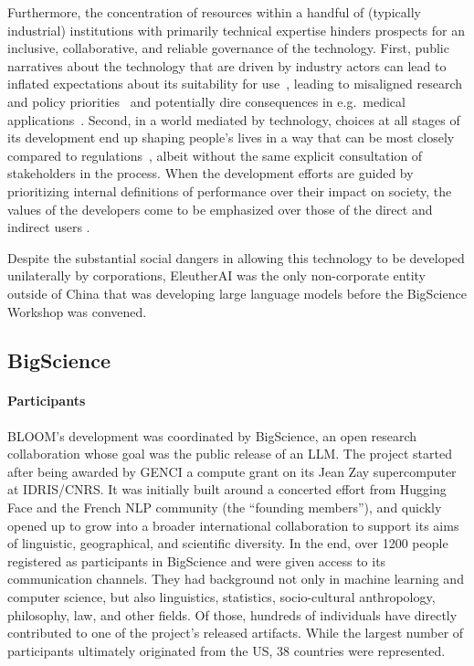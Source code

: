 Furthermore, the concentration of resources within a handful of (typically industrial) institutions with primarily technical expertise hinders prospects for an inclusive, collaborative, and reliable governance of the technology. First, public narratives about the technology that are driven by industry actors can lead to inflated expectations about its suitability for use~\citep{brennen2018hype,brennen2022expect}, leading to misaligned research and policy priorities~\citep{raji2022fallacy} and potentially dire consequences in e.g.\ medical applications~\citep{wong2021sepsis}. Second, in a world mediated by technology, choices at all stages of its development end up shaping people's lives in a way that can be most closely compared to regulations~\citep{winner1977technology,winner2017artifacts}, albeit without the same explicit consultation of stakeholders in the process. When the development efforts are guided by prioritizing internal definitions of performance over their impact on society, the values of the developers come to be emphasized over those of the direct and indirect users \citep{birhane2022values}.

Despite the substantial social dangers in allowing this technology to be developed unilaterally by corporations, EleutherAI \citep{phang2022eleutherai} was the only non-corporate entity outside of China that was developing large language models before the BigScience Workshop was convened.

\subsection{BigScience}\label{sec:organization}

\paragraph{Participants}
BLOOM's development was coordinated by BigScience, an open research collaboration whose goal was the public release of an LLM. The project started after being awarded by GENCI a compute grant on its Jean Zay supercomputer at IDRIS/CNRS. It was initially built around a concerted effort from Hugging Face and the French NLP community (the ``founding members''), and quickly opened up to grow into a broader international collaboration to support its aims of linguistic, geographical, and scientific diversity. In the end, over 1200 people registered as participants in BigScience and were given access to its communication channels. They had background not only in machine learning and computer science, but also linguistics, statistics, socio-cultural anthropology, philosophy, law, and other fields. Of those, hundreds of individuals have directly contributed to one of the project’s released artifacts. While the largest number of participants ultimately originated from the US, 38 countries were represented.

